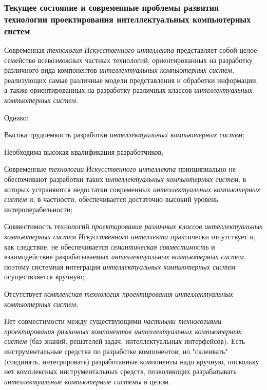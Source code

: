 \subsubsection{Текущее состояние и современные проблемы развития технологии проектирования интеллектуальных компьютерных систем}

Современная \textit{технология} \textit{Искусственного интеллекта} представляет собой целое семейство всевозможных частных технологий, ориентированных на разработку различного вида компонентов \textit{интеллектуальных компьютерных систем,} реализующих самые различные модели представления и обработки информации, а также ориентированных на разработку различных классов \textit{интеллектуальных компьютерных систем}.

Однако:

\begin{textitemize}
	\item
	Высока трудоемкость разработки \textit{интеллектуальных компьютерных систем};
	\item
	Необходима высокая квалификация разработчиков;
	\item
	Современные \textit{технологии} \textit{Искусственного интеллекта} принципиально не обеспечивают разработки таких \textit{интеллектуальных компьютерных систем,} в которых устраняются недостатки современных \textit{интеллектуальных компьютерных систем} и, в частности, обеспечивается достаточно высокий уровень интероперабельности;
	\item
	Совместимость технологий \textit{проектирования различных классов интеллектуальных компьютерных систем} \textit{Искусственного интеллекта} практически отсутствует и, как следствие, не обеспечивается \textit{семантическая совместимость} и взаимодействие разрабатываемых \textit{интеллектуальных компьютерных систем}, поэтому системная интеграция \textit{интеллектуальных компьютерных систем} осуществляется вручную;
	\item
	Отсутствует \textit{комплексная технология проектирования} \textit{интеллектуальных компьютерных систем};
	\item
	Нет совместимости между существующими \textit{частными технологиями проектирования различных компонентов интеллектуальных компьютерных систем} (баз знаний, решателей задач, интеллектуальных интерфейсов). Есть инструментальные средства по разработке компонентов, но "склеивать" (соединять, интегрировать) разработанные компоненты надо вручную, поскольку нет комплексных инструментальных средств, позволяющих разрабатывать \textit{интеллектуальные компьютерные системы} в целом.
\end{textitemize}

